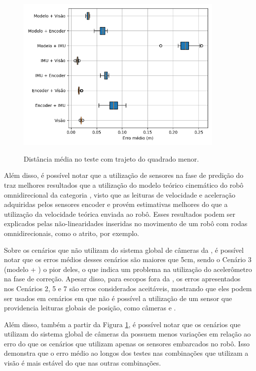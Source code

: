 \documentclass[acronym, symbols, table]{fei}
\begin{document}
	\begin{figure}[!htb]
		\centering
		\caption{Distância média no teste com trajeto do quadrado menor.}
		\includegraphics[width=0.9\textwidth]{../Dados/Graficos-Resultados/erro_medio_distancia_quadrado_menor.png}
		\label{fig:erro_medio_distancia_quad_menor}
	\end{figure}

	Além disso, é possível notar que a utilização de sensores na fase de predição do  traz melhores resultados que a utilização do modelo teórico cinemático do robô omnidirecional da categoria , visto que as leituras de velocidade e aceleração adquiridas pelos sensores encoder e  provém estimativas melhores do que a utilização da velocidade teórica enviada ao robô. Esses resultados podem ser explicados pelas não-linearidades inseridas no movimento de um robô com rodas omnidirecionais, como o atrito, por exemplo.
	
	Sobre os cenários que não utilizam do sistema global de câmeras da , é possível notar que os erros médios desses cenários são maiores que 5cm, sendo o Cenário 3 (modelo + ) o pior deles, o que indica um problema na utilização do acelerômetro na fase de correção. Apesar disso, para escopos fora da , os erros apresentados nos Cenários 2, 5 e 7 são erros considerados aceitáveis, mostrando que eles podem ser usados em cenários em que não é possível a utilização de um sensor que providencia leituras globais de posição, como câmeras e .

	Além disso, também a partir da Figura \ref{fig:erro_medio_distancia_quad_menor}, é possível notar que os cenários que utilizam do sistema global de câmeras da  possuem menos variações em relação ao erro do que os cenários que utilizam apenas os sensores embarcados no robô. Isso demonstra que o erro médio ao longos dos testes nas combinações que utilizam a visão é mais estável do que nas outras combinações.
	
\end{document}
